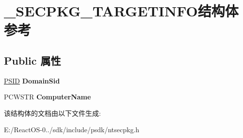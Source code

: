 \hypertarget{struct___s_e_c_p_k_g___t_a_r_g_e_t_i_n_f_o}{}\section{\+\_\+\+S\+E\+C\+P\+K\+G\+\_\+\+T\+A\+R\+G\+E\+T\+I\+N\+F\+O结构体 参考}
\label{struct___s_e_c_p_k_g___t_a_r_g_e_t_i_n_f_o}
\subsection*{Public 属性}
\begin{DoxyCompactItemize}
\item 
\mbox{\label{struct___s_e_c_p_k_g___t_a_r_g_e_t_i_n_f_o_a255f6f70de2c3442fac0f302827f56ba}} 
\hyperlink{struct___s_i_d}{P\+S\+ID} {\bfseries Domain\+Sid}
\item 
\mbox{\label{struct___s_e_c_p_k_g___t_a_r_g_e_t_i_n_f_o_a6bdaf35b5e28d9f5aeea085989cbafec}} 
P\+C\+W\+S\+TR {\bfseries Computer\+Name}
\end{DoxyCompactItemize}


该结构体的文档由以下文件生成\+:\begin{DoxyCompactItemize}
\item 
E\+:/\+React\+O\+S-\/0../sdk/include/psdk/ntsecpkg.\+h\end{DoxyCompactItemize}
